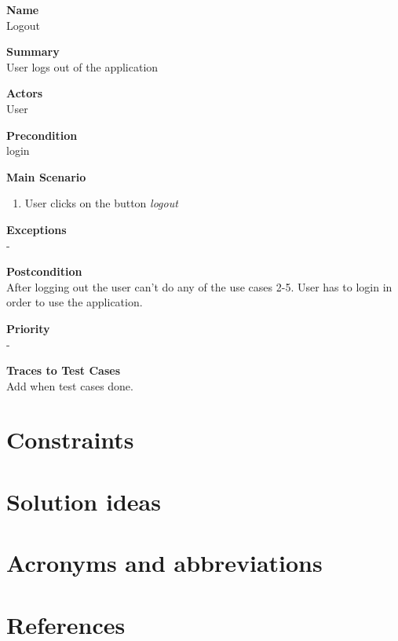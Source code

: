 \documentclass[12pt]{article}
\begin{document}
\noindent
{\bf Name}\\
Logout

\noindent
{\bf Summary}\\
User logs out of the application

\noindent
{\bf Actors}\\
User

\noindent
{\bf Precondition}\\
login

\noindent
{\bf Main Scenario}\\
\vspace*{-0.2in}
\begin{enumerate}
\item	User clicks on the button \textit{logout }


\end{enumerate}

\noindent
{\bf Exceptions}\\
-

\noindent
{\bf Postcondition}\\
After logging out the user can’t do any of the use cases 2-5. User has to login in order to use the application.

\noindent
{\bf Priority}\\
-

\noindent
{\bf Traces to Test Cases}\\
Add when test cases done.


\section{Constraints}

\section{Solution ideas}

\section{Acronyms and abbreviations}

\section{References}
\end{document}

